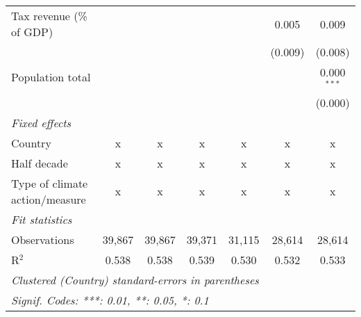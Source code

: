 \begin{tabular}{lcccccc}
   Tax revenue (\% of GDP)              &         &               &               &               & 0.005         & 0.009\\   
                                        &         &               &               &               & (0.009)       & (0.008)\\   
   Population total                     &         &               &               &               &               & 0.000$^{***}$\\   
                                        &         &               &               &               &               & (0.000)\\   
   \emph{Fixed effects}\\
   Country                              & x       & x             & x             & x             & x             & x\\  
   Half decade                          & x       & x             & x             & x             & x             & x\\  
   Type of climate action/measure       & x       & x             & x             & x             & x             & x\\  
   \midrule \emph{Fit statistics}\\
   Observations                         & 39,867  & 39,867        & 39,371        & 31,115        & 28,614        & 28,614\\  
   R$^2$                                & 0.538   & 0.538         & 0.539         & 0.530         & 0.532         & 0.533\\  
   \midrule
   \multicolumn{7}{l}{\emph{Clustered (Country) standard-errors in parentheses}}\\
   \multicolumn{7}{l}{\emph{Signif. Codes: ***: 0.01, **: 0.05, *: 0.1}}\\
\end{tabular}
\par\endgroup


